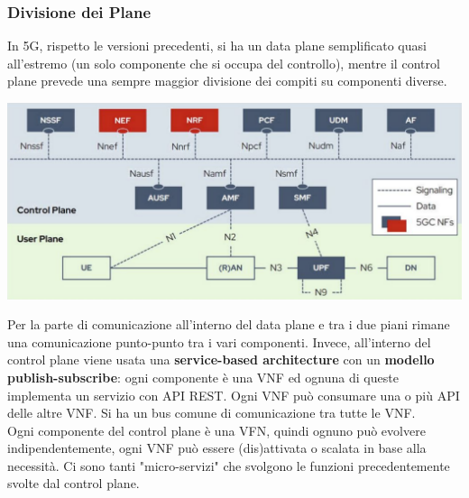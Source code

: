 \subsubsection{Divisione dei Plane}
In 5G, rispetto le versioni precedenti, si ha un data plane semplificato quasi all'estremo (un solo componente che si occupa del controllo), mentre il control plane prevede una sempre maggior divisione dei compiti su componenti diverse.
\begin{center}
	\includegraphics[width=0.9\linewidth]{img/5g/arch}
\end{center}

Per la parte di comunicazione all'interno del data plane e tra i due piani rimane una comunicazione punto-punto tra i vari componenti. Invece, all'interno del control plane viene usata una \textbf{service-based architecture} con un \textbf{modello publish-subscribe}: ogni componente è una VNF ed ognuna di queste implementa un servizio con API REST. Ogni VNF può consumare una o più API delle altre VNF. Si ha un bus comune di comunicazione tra tutte le VNF.\\

Ogni componente del control plane è una VFN, quindi ognuno può evolvere indipendentemente, ogni VNF può essere (dis)attivata o scalata in base alla necessità. Ci sono tanti "micro-servizi" che svolgono le funzioni precedentemente svolte dal control plane.\\

